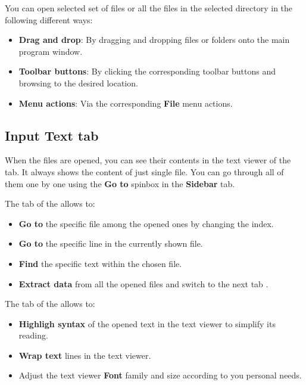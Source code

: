 You can open selected set of files or all the files in the selected directory in the following different ways:

\begin{itemize}
	\item \textbf{Drag and drop}: By dragging and dropping files or folders onto the main program window.
	\item \textbf{Toolbar buttons}: By clicking the corresponding toolbar buttons and browsing to the desired location.
	\item \textbf{Menu actions}: Via the corresponding \textbf{File} menu actions.
\end{itemize}

\subsection{Input Text tab}

When the files are opened, you can see their contents in the text viewer of the  tab. It always shows the content of just single file. You can go through all of them one by one using the \textbf{Go to} spinbox in the \textbf{Sidebar}  tab.


The  tab of the  allows to:

\begin{itemize}
	\item \textbf{Go to} the specific file among the opened ones by changing the index.
	\item \textbf{Go to} the specific line in the currently shown file.
	\item \textbf{Find} the specific text within the chosen file.
	\item \textbf{Extract data} from all the opened files and switch to the next tab .
\end{itemize}

The  tab of the  allows to:

\begin{itemize}
	\item \textbf{Highligh syntax} of the opened text in the text viewer to simplify its reading.
	\item \textbf{Wrap text} lines in the text viewer.
	\item Adjust the text viewer \textbf{Font} family and size according to you personal needs.
\end{itemize}

